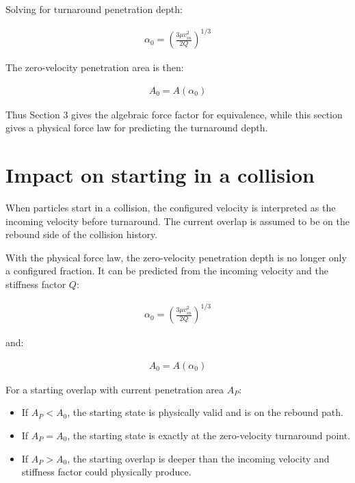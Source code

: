 Solving for turnaround penetration depth:

\begin{equation}
\begin{aligned}
\alpha_0
=
\left(\frac{3\mu v_{in}^2}{2Q}\right)^{1/3}
\end{aligned}
\end{equation}

The zero-velocity penetration area is then:

\begin{equation}
\begin{aligned}
A_0 = A(\alpha_0)
\end{aligned}
\end{equation}

Thus Section 3 gives the algebraic force factor for equivalence, while this
section gives a physical force law for predicting the turnaround depth.

\section{Impact on starting in a collision}

When particles start in a collision, the configured velocity is interpreted as
the incoming velocity before turnaround.  The current overlap is assumed to be
on the rebound side of the collision history.

With the physical force law, the zero-velocity penetration depth is no longer
only a configured fraction.  It can be predicted from the incoming velocity and
the stiffness factor $Q$:

\begin{equation}
\begin{aligned}
\alpha_0
=
\left(\frac{3\mu v_{in}^2}{2Q}\right)^{1/3}
\end{aligned}
\end{equation}

and:

\begin{equation}
\begin{aligned}
A_0 = A(\alpha_0)
\end{aligned}
\end{equation}

For a starting overlap with current penetration area $A_P$:

\begin{itemize}[leftmargin=*]
    \item If $A_P < A_0$, the starting state is physically valid and is on the
    rebound path.
    \item If $A_P = A_0$, the starting state is exactly at the zero-velocity
    turnaround point.
    \item If $A_P > A_0$, the starting overlap is deeper than the incoming
    velocity and stiffness factor could physically produce.
\end{itemize}

